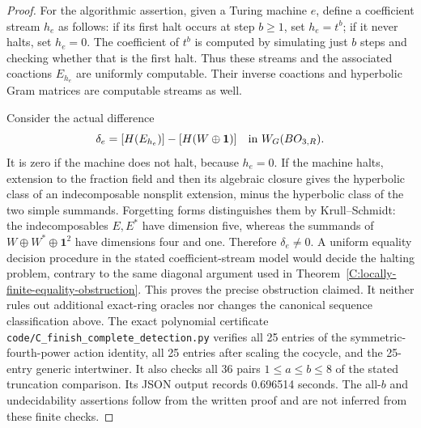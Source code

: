 \begin{proof}
For the algorithmic assertion, given a Turing machine
$e$, define a coefficient stream $h_e$ as follows:
if its first halt occurs at step $b\geq1$, set $h_e=t^b$;
if it never halts, set $h_e=0$.
The coefficient of $t^b$ is computed by simulating just
$b$ steps and checking whether that is the first halt.
Thus these streams and the associated coactions $E_{h_e}$
are uniformly computable.  Their inverse coactions and
hyperbolic Gram matrices are computable streams as well.

Consider the actual difference
\[
    \delta_e=[H(E_{h_e})]-[H(W\oplus\mathbf1)]
                      \quad\hbox{in }W_G(BO_{3,R}).
\]
It is zero if the machine does not halt, because $h_e=0$.
If the machine halts, extension to the fraction field
and then its algebraic closure gives the hyperbolic class
of an indecomposable nonsplit extension, minus the
hyperbolic class of the two simple summands.
Forgetting forms distinguishes them by Krull--Schmidt:
the indecomposables $E,E^*$ have dimension five, whereas
the summands of $W\oplus W^*\oplus\mathbf1^2$ have
dimensions four and one.  Therefore $\delta_e\ne0$.
A uniform equality decision procedure in the stated
coefficient-stream model would decide the halting problem,
contrary to the same diagonal argument used in
Theorem~\ref{C:locally-finite-equality-obstruction}.
This proves the precise obstruction claimed.  It neither
rules out additional exact-ring oracles nor changes the
canonical sequence classification above.
The exact polynomial certificate
\texttt{code/C\_finish\_complete\_detection.py} verifies all
25 entries of the symmetric-fourth-power action identity,
all 25 entries after scaling the cocycle, and the 25-entry
generic intertwiner.  It also checks all 36 pairs
$1\leq a\leq b\leq8$ of the stated truncation comparison.
Its JSON output records 0.696514 seconds.  The all-$b$
and undecidability assertions follow from the written
proof and are not inferred from these finite checks.
\end{proof}
